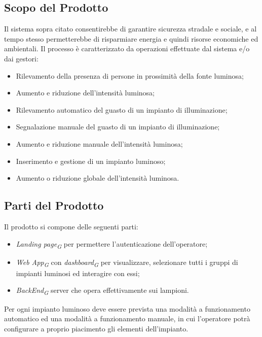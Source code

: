 \documentclass[a4paper, 12pt]{article}
\begin{document}
\subsection{Scopo del Prodotto}
Il sistema sopra citato consentirebbe di garantire sicurezza stradale e sociale, e al tempo stesso permetterebbe di risparmiare energia e quindi risorse economiche ed ambientali. Il processo è caratterizzato da operazioni effettuate dal sistema e/o dai gestori:
\begin{itemize}
    \item Rilevamento della presenza di persone in prossimità della fonte luminosa;
    \item Aumento e riduzione dell'intensità luminosa;
    \item Rilevamento automatico del guasto di un impianto di illuminazione;
    \item Segnalazione manuale del guasto di un impianto di illuminazione;
    \item Aumento e riduzione manuale dell'intensità luminosa;
    \item Inserimento e gestione di un impianto luminoso;
    \item Aumento o riduzione globale dell'intensità luminosa.
\end{itemize}

\subsection{Parti del Prodotto}
Il prodotto si compone delle seguenti parti: %
\begin{itemize}
    \item \textit{Landing page\textsubscript{G}} per permettere l'autenticazione dell'operatore;
    \item \textit{Web App\textsubscript{G}} con \textit{dashboard\textsubscript{G}} per visualizzare, selezionare tutti i gruppi di
          impianti luminosi ed interagire con essi;
    \item \textit{BackEnd\textsubscript{G}} server che opera effettivamente sui lampioni.
\end{itemize}
Per ogni impianto luminoso deve essere prevista una modalità a funzionamento
automatico ed una modalità a funzionamento manuale, in cui l'operatore potrà
configurare a proprio piacimento gli elementi dell'impianto.
\end{document}
